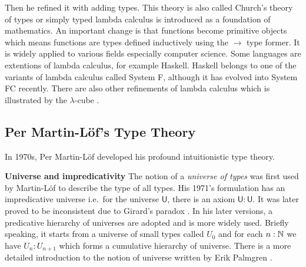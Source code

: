 Then he refined it with adding types. This theory is also called
Church's theory of types or simply typed lambda calculus is
introduced as a foundation of mathematics. An important change is that functions become primitive objects which means functions are types defined inductively using the $\rightarrow$ type former. It is widely applied to
various fields especially computer science. Some languages are extentions of lambda calculus, for example Haskell. Haskell belongs to one of the variants of lambda calculus called System F, although it has evolved into System FC recently. There are also other refinements of lambda calculus which is illustrated by the $\lambda$-cube \cite{barendregt1991introduction}.



\subsection{Per Martin-L\"{o}f's Type Theory}


In 1970s, Per Martin-L\"{o}f \cite{per:71,per:82}  developed his profound intuitionistic type theory. 


\textbf{Universe and impredicativity} The notion of a \emph{universe of types}  was first used by Martin-L\"{o}f \cite{Martin-Lof-1973} to describe the type of all types. 
His 1971's formulation has an impredicative universe i.e.\ for the universe $\mathsf{U}$, there is an axiom $\mathsf{U} : \mathsf{U}$. 
It was later proved to be inconsistent due to Girard's paradox \cite{hurkens1995simplification}.
In his later versions, a predicative hierarchy of universes are adopted and is more widely used. Briefly speaking, it starts from a universe of small types called $U_0$ and for each $n : \mathbb{N}$ we have $U_n : U_{n+1}$ which forms a cumulative hierarchy of universe. There is a more detailed introduction to the notion of universe written by Erik Palmgren \cite{Palmgren98onuniverses}.



